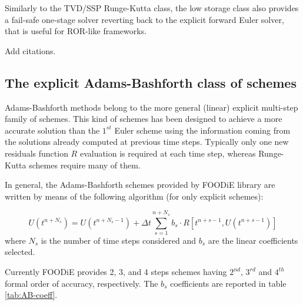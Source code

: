 \documentclass[pdftex,preprint,3p,times,numbers]{elsarticle}
\begin{document}
Similarly to the TVD/SSP Runge-Kutta class, the low storage class also provides a fail-safe one-stage solver reverting back to the explicit forward Euler solver, that is useful for ROR-like frameworks.

{\color{red} Add citations.}

\subsection{The explicit Adams-Bashforth class of schemes}

Adams-Bashforth methods belong to the more general (linear) explicit multi-step family of schemes. This kind of schemes has been designed to achieve a more accurate solution than the $1^{st}$ Euler scheme using the information coming from the solutions already computed at previous time steps. Typically only one new residuals function $R$ evaluation is required at each time step, whereas Runge-Kutta schemes require many of them.

In general, the Adams-Bashforth schemes provided by FOODiE library are written by means of the following algorithm (for only explicit schemes):

\begin{equation}
U\left(t^{n+N_s}\right) = U\left(t^{n+N_s-1}\right) +\Delta t \sum_{s=1}^{n+N_s}{ b_s \cdot R\left[t^{n+s-1}, U\left(t^{n+s-1}\right)\right]}
\label{eq:AB}
\end{equation}
where $N_s$ is the number of time steps considered and $b_s$ are the linear coefficients selected.

Currently FOODiE provides 2, 3, and 4 steps schemes having $2^{nd}$, $3^{rd}$ and $4^{th}$ formal order of accuracy, respectively. The $b_s$ coefficients are reported in table \ref{tab:AB-coeff}.

\begin{table}[!ht]
  \centering
  \caption{Explicit Adams-Bashforth coefficients\label{tab:AB-coeff}}
\end{table}
\end{document}
